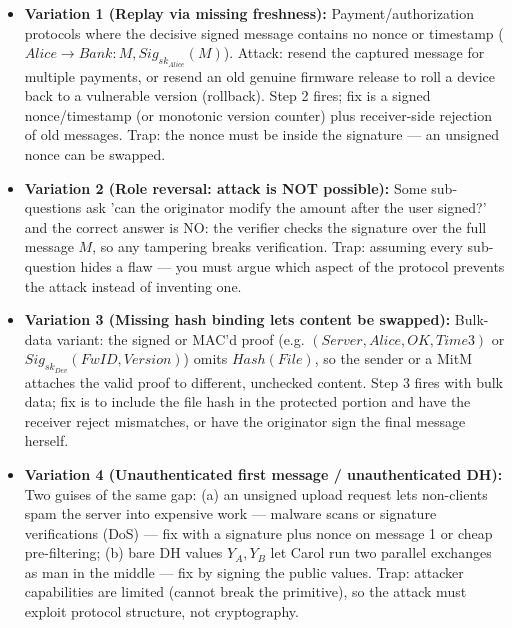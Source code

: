 \documentclass[12pt, a4paper]{article}
\begin{document}
\begin{trapbox}
\begin{itemize}
    \item \textbf{Variation 1 (Replay via missing freshness):} Payment/authorization protocols where the decisive signed message contains no nonce or timestamp ($Alice \to Bank : M, Sig_{sk_{Alice}}(M)$). Attack: resend the captured message for multiple payments, or resend an old genuine firmware release to roll a device back to a vulnerable version (rollback). Step 2 fires; fix is a signed nonce/timestamp (or monotonic version counter) plus receiver-side rejection of old messages. Trap: the nonce must be inside the signature --- an unsigned nonce can be swapped.
    \item \textbf{Variation 2 (Role reversal: attack is NOT possible):} Some sub-questions ask 'can the originator modify the amount after the user signed?' and the correct answer is NO: the verifier checks the signature over the full message $M$, so any tampering breaks verification. Trap: assuming every sub-question hides a flaw --- you must argue which aspect of the protocol prevents the attack instead of inventing one.
    \item \textbf{Variation 3 (Missing hash binding lets content be swapped):} Bulk-data variant: the signed or MAC'd proof (e.g. $(Server, Alice, OK, Time3)$ or $Sig_{sk_{Dev}}(FwID, Version)$) omits $Hash(File)$, so the sender or a MitM attaches the valid proof to different, unchecked content. Step 3 fires with bulk data; fix is to include the file hash in the protected portion and have the receiver reject mismatches, or have the originator sign the final message herself.
    \item \textbf{Variation 4 (Unauthenticated first message / unauthenticated DH):} Two guises of the same gap: (a) an unsigned upload request lets non-clients spam the server into expensive work --- malware scans or signature verifications (DoS) --- fix with a signature plus nonce on message 1 or cheap pre-filtering; (b) bare DH values $Y_A, Y_B$ let Carol run two parallel exchanges as man in the middle --- fix by signing the public values. Trap: attacker capabilities are limited (cannot break the primitive), so the attack must exploit protocol structure, not cryptography.
\end{itemize}
\end{trapbox}
\end{document}
